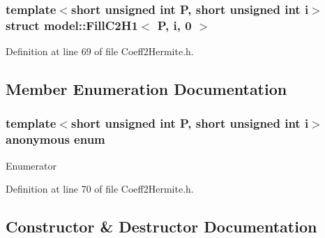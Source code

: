 \subsubsection*{template$<$short unsigned int P, short unsigned int i$>$struct model\+::\+Fill\+C2\+H1$<$ P, i, 0 $>$}



Definition at line 69 of file Coeff2\+Hermite.\+h.



\subsection{Member Enumeration Documentation}
\hypertarget{structmodel_1_1_fill_c2_h1_3_01_p_00_01i_00_010_01_4_a1a39f8b07213b67d0257ec221f75bc63}{}\subsubsection[{anonymous enum}]{\setlength{\rightskip}{0pt plus 5cm}template$<$short unsigned int P, short unsigned int i$>$ anonymous enum}\label{structmodel_1_1_fill_c2_h1_3_01_p_00_01i_00_010_01_4_a1a39f8b07213b67d0257ec221f75bc63}
\begin{Desc}
\item[Enumerator]\par
\begin{description}
\item[{\em 
\hypertarget{structmodel_1_1_fill_c2_h1_3_01_p_00_01i_00_010_01_4_a1a39f8b07213b67d0257ec221f75bc63acd0fd86c2f83eccc8c00a5cb8f1b0c71}{}j\label{structmodel_1_1_fill_c2_h1_3_01_p_00_01i_00_010_01_4_a1a39f8b07213b67d0257ec221f75bc63acd0fd86c2f83eccc8c00a5cb8f1b0c71}
}]\end{description}
\end{Desc}


Definition at line 70 of file Coeff2\+Hermite.\+h.



\subsection{Constructor \& Destructor Documentation}
\hypertarget{structmodel_1_1_fill_c2_h1_3_01_p_00_01i_00_010_01_4_a1bc5c8815a9ed8652604988700d400e9}{}

